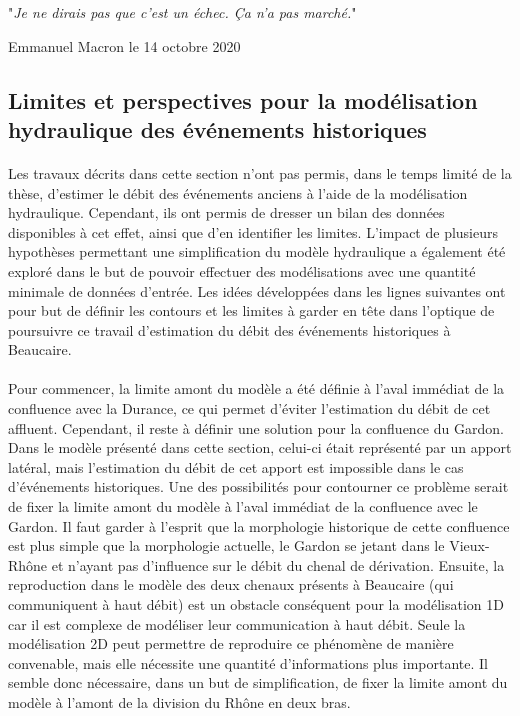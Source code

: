 \documentclass[11pt]{article}
\begin{document}
	\epigraph{"\textit{Je ne dirais pas que c'est un échec. Ça n'a pas marché.}"}{Emmanuel Macron le 14 octobre 2020}
		
	\FloatBarrier	
	\subsection{Limites et perspectives pour la modélisation hydraulique des événements historiques}
	
	\paragraph{} Les travaux décrits dans cette section n'ont pas permis, dans le temps limité de la thèse, d'estimer le débit des événements anciens à l'aide de la modélisation hydraulique. Cependant, ils ont permis de dresser un bilan des données disponibles à cet effet, ainsi que d'en identifier les limites. L'impact de plusieurs hypothèses permettant une simplification du modèle hydraulique a également été exploré dans le but de pouvoir effectuer des modélisations avec une quantité minimale de données d'entrée. Les idées développées dans les lignes suivantes ont pour but de définir les contours et les limites à garder en tête dans l'optique de poursuivre ce travail d'estimation du débit des événements historiques à Beaucaire.
	
	\paragraph{} Pour commencer, la limite amont du modèle a été définie à l'aval immédiat de la confluence avec la Durance, ce qui permet d'éviter l'estimation du débit de cet affluent. Cependant, il reste à définir une solution pour la confluence du Gardon. Dans le modèle présenté dans cette section, celui-ci était représenté par un apport latéral, mais l'estimation du débit de cet apport est impossible dans le cas d'événements historiques. Une des possibilités pour contourner ce problème serait de fixer la limite amont du modèle à l'aval immédiat de la confluence avec le Gardon. Il faut garder à l'esprit que la morphologie historique de cette confluence est plus simple que la morphologie actuelle, le Gardon se jetant dans le Vieux-Rhône et n'ayant pas d'influence sur le débit du chenal de dérivation. Ensuite, la reproduction dans le modèle des deux chenaux présents à Beaucaire (qui communiquent à haut débit) est un obstacle conséquent pour la modélisation 1D car il est complexe de modéliser leur communication à haut débit. Seule la modélisation 2D peut permettre de reproduire ce phénomène de manière convenable, mais elle nécessite une quantité d'informations plus importante. Il semble donc nécessaire, dans un but de simplification, de fixer la limite amont du modèle à l'amont de la division du Rhône en deux bras. 
	
\end{document}
